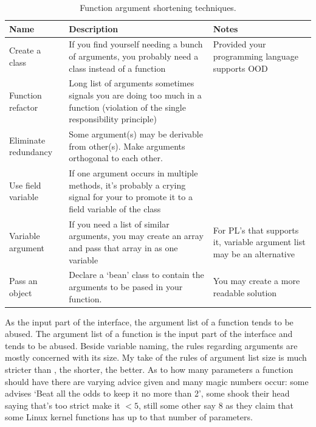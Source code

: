 \begin{table}[h]
    \begin{center}
        \caption{Function argument shortening techniques.\label{tbl:arg-shorten-tech}}
        \begin{tabular}{|l|p{5cm}|p{3cm}|}
            \hline
            Name & Description & Notes \\
            \hline
            Create a class
            & If you find yourself needing a bunch of arguments, you
            probably need a class instead of a function
            & Provided your programming language supports OOD \\
            \hline
            Function refactor
            & Long list of arguments sometimes signals you are doing
            too much in a function (violation of the single responsibility principle)
            & \\
            \hline
            Eliminate redundancy
            & Some argument(s) may be derivable from other(s).
            Make arguments orthogonal to each other.
            & \\
            \hline
            Use field variable
            & If one argument occurs in multiple methods, it's probably a
            crying signal for your to promote it to a field variable of the class
            & \\
            \hline
            Variable argument
            & If you need a list of similar arguments, you may create an array
            and pass that array in as one variable
            & For PL's that supports it, variable argument list may be an alternative \\
            \hline
            Pass an object
            & Declare a `bean' class to contain the arguments to be pased in your function.
            & You may create a more readable solution \\
            \hline
        \end{tabular}
    \end{center}
\end{table}

As the input part of the interface, the argument list of a function tends to be abused.
The argument list of a function is the input part of the interface and tends to be abused.
Beside variable naming,
the rules regarding arguments are mostly concerned with its size.
My take of the rules of argument list size is much stricter than , the shorter, the better.
As to how many parameters a function should have there are varying advice given and many magic
numbers occur: some advises `Beat all the odds to keep it no more than 2', some shook their head
saying that's too strict make it $<5$, still some other say $8$ as they claim that some Linux
kernel functions has up to that number of parameters.

